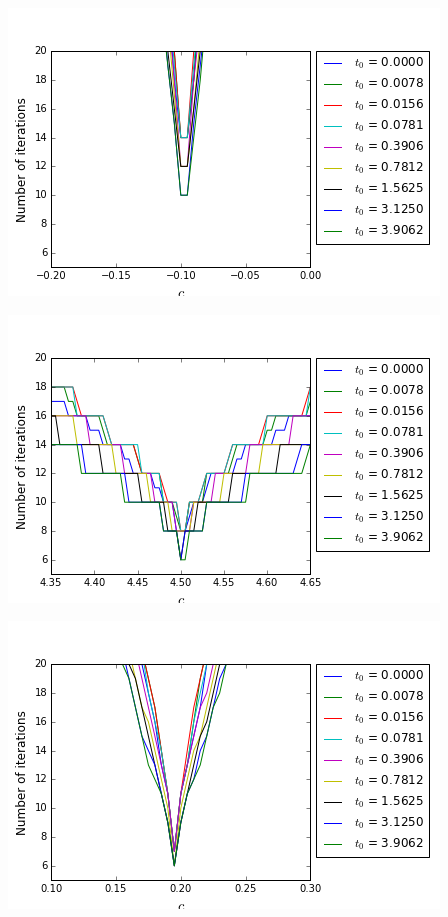 \hfill
\begin{minipage}[t]{.45\linewidth}
	\includegraphics[scale=.4]{figures/FinalFigures/NiterxCoefVarT0FinalVersionNDetail2.png}
\end{minipage}
\begin{minipage}[t]{.45\linewidth}
	\includegraphics[scale=.4]{figures/FinalFigures/NiterxCoefVarT0FinalVersionPDetail.png}
\end{minipage}
\hfill
\begin{minipage}[t]{.45\linewidth}
	\includegraphics[scale=.4]{figures/FinalFigures/NiterxCoefVarT0FinalVersionPDetail2.png}
\end{minipage}

